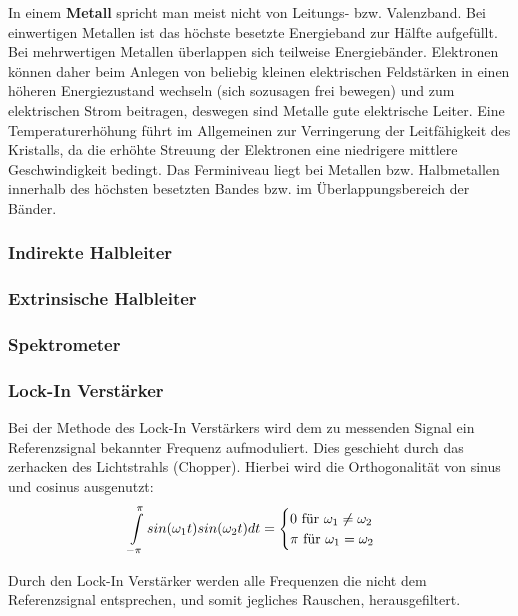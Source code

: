 \documentclass[12pt]{article}
\begin{document}
In einem \textbf{Metall} spricht man meist nicht von Leitungs- bzw. Valenzband. Bei einwertigen Metallen ist das höchste
besetzte Energieband zur Hälfte aufgefüllt. Bei mehrwertigen Metallen überlappen sich teilweise Energiebänder. Elektronen
können daher beim Anlegen von beliebig kleinen elektrischen Feldstärken in einen höheren Energiezustand wechseln (sich
sozusagen frei bewegen) und zum elektrischen Strom beitragen, deswegen sind Metalle gute elektrische Leiter. Eine
Temperaturerhöhung führt im Allgemeinen zur Verringerung der Leitfähigkeit des Kristalls, da die erhöhte Streuung der
Elektronen eine niedrigere mittlere Geschwindigkeit bedingt. Das Ferminiveau liegt bei Metallen bzw. Halbmetallen
innerhalb des höchsten besetzten Bandes bzw. im Überlappungsbereich der Bänder.

\subsubsection{Indirekte Halbleiter}

\subsubsection{Extrinsische Halbleiter}

\subsubsection{Spektrometer}

\subsubsection{Lock-In Verstärker}
Bei der Methode des Lock-In Verstärkers wird dem zu messenden Signal ein Referenzsignal bekannter Frequenz aufmoduliert.
Dies geschieht durch das zerhacken des Lichtstrahls (Chopper). Hierbei wird die Orthogonalität von
sinus und cosinus ausgenutzt:
\begin{align}
 \int \limits_{-\pi} \limits^{\pi} sin(\omega_1 t)sin(\omega_2 t) dt = \begin{cases} 0 \textnormal{ für } \omega_1\neq\omega_2\\ \pi \textnormal{ für } \omega_1 = \omega_2\end{cases}
\end{align}

Durch den Lock-In Verstärker werden alle Frequenzen die nicht dem Referenzsignal entsprechen, und somit jegliches Rauschen, herausgefiltert. \\
\end{document}
